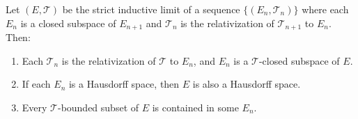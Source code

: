Let $(E, \mathcal{T})$ be the strict inductive limit of a sequence $\{(E_n, \mathcal{T}_n)\}$ where each $E_n$ is a closed subspace of $E_{n+1}$ and $\mathcal{T}_n$ is the relativization of $\mathcal{T}_{n+1}$ to $E_n$. Then:

\begin{enumerate}
    \item[(i)] Each $\mathcal{T}_n$ is the relativization of $\mathcal{T}$ to $E_n$, and $E_n$ is a $\mathcal{T}$-closed subspace of $E$.
    \item[(ii)] If each $E_n$ is a Hausdorff space, then $E$ is also a Hausdorff space.
    \item[(iii)] Every $\mathcal{T}$-bounded subset of $E$ is contained in some $E_n$.
\end{enumerate}
